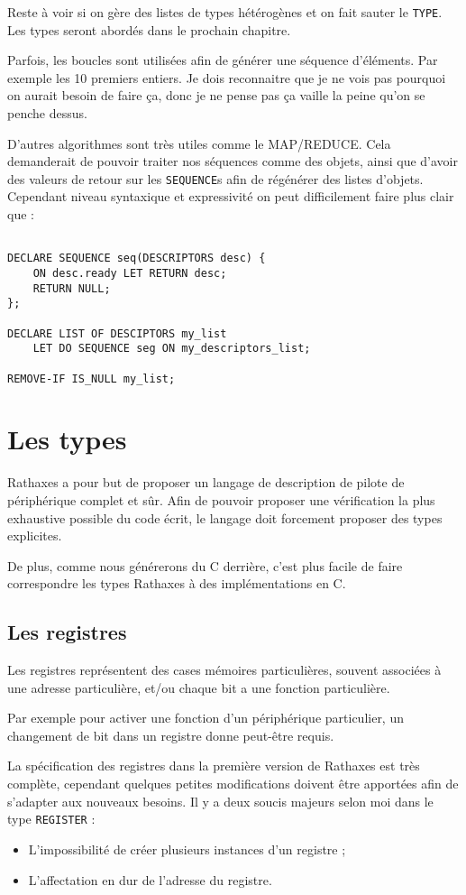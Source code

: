 \documentclass{rtxreport}
\begin{document}
Reste à voir si on gère des listes de types hétérogènes et on fait sauter le \texttt{TYPE}. Les types seront abordés dans le prochain chapitre.

Parfois, les boucles sont utilisées afin de générer une séquence d’éléments. Par exemple les 10 premiers entiers. Je dois reconnaitre que je ne vois pas pourquoi on aurait besoin de faire ça, donc je ne pense pas ça vaille la peine qu’on se penche dessus.

D’autres algorithmes sont très utiles comme le MAP/REDUCE. Cela demanderait de pouvoir traiter nos séquences comme des objets, ainsi que d’avoir des valeurs de retour sur les \texttt{SEQUENCE}s afin de régénérer des listes d’objets. Cependant niveau syntaxique et expressivité on peut difficilement faire plus clair que :
\begin{lstlisting}

DECLARE SEQUENCE seq(DESCRIPTORS desc) {
	ON desc.ready LET RETURN desc;
	RETURN NULL;
};

DECLARE LIST OF DESCIPTORS my_list
	LET DO SEQUENCE seg ON my_descriptors_list;

REMOVE-IF IS_NULL my_list;

\end{lstlisting}

\chapter{Les types}

Rathaxes a pour but de proposer un langage de description de pilote de périphérique complet et sûr. Afin de pouvoir proposer une vérification la plus exhaustive possible du code écrit, le langage doit forcement proposer des types explicites.

De plus, comme nous générerons du C derrière, c’est plus facile de faire correspondre les types Rathaxes à des implémentations en C.

\section{Les registres}

Les registres représentent des cases mémoires particulières, souvent associées à une adresse particulière, et/ou chaque bit a une fonction particulière.

Par exemple pour activer une fonction d’un périphérique particulier, un changement de bit dans un registre donne peut-être requis.

La spécification des registres dans la première version de Rathaxes est très complète, cependant quelques petites modifications doivent être apportées afin de s’adapter aux nouveaux besoins.
Il y a deux soucis majeurs selon moi dans le type \texttt{REGISTER} : 
\begin{itemize}
	\item L’impossibilité de créer plusieurs instances d’un registre ; 
	\item L’affectation en dur de l’adresse du registre. 
\end{itemize}
\end{document}
